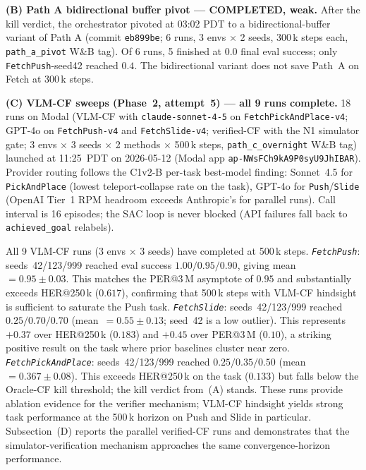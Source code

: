 \documentclass{article}
\begin{document}
\textbf{(B) Path A bidirectional buffer pivot --- COMPLETED, weak.}
After the kill verdict, the orchestrator pivoted at 03:02 PDT to a
bidirectional-buffer variant of Path A (commit \texttt{eb899be}; 6 runs,
3 envs $\times$ 2 seeds, 300\,k steps each, \texttt{path\_a\_pivot} W\&B
tag). Of 6 runs, 5 finished at $0.0$ final eval success; only
\texttt{FetchPush}-seed42 reached $0.4$. The bidirectional variant does
not save Path~A on Fetch at 300\,k steps.

\textbf{(C) VLM-CF sweeps (Phase~2, attempt~5) --- all 9 runs complete.}
18 runs on Modal (VLM-CF with \texttt{claude-sonnet-4-5} on
\texttt{FetchPickAndPlace-v4}; GPT-4o on \texttt{FetchPush-v4} and
\texttt{FetchSlide-v4}; verified-CF with the N1 simulator gate; 3 envs
$\times$ 3 seeds $\times$ 2 methods $\times$ 500\,k steps, \texttt{path\_c\_overnight}
W\&B tag) launched at 11:25~PDT on 2026-05-12 (Modal app
\texttt{ap-NWsFCh9kA9P0syU9JhIBAR}). Provider routing follows the
C1v2-B per-task best-model finding: Sonnet~4.5 for \texttt{PickAndPlace}
(lowest teleport-collapse rate on the task), GPT-4o for
\texttt{Push}/\texttt{Slide} (OpenAI Tier~1 RPM headroom exceeds Anthropic's
for parallel runs). Call interval is 16 episodes; the SAC loop is never
blocked (API failures fall back to \texttt{achieved\_goal} relabels).

All 9 VLM-CF runs (3 envs $\times$ 3 seeds) have completed at 500\,k steps.
\emph{\texttt{FetchPush}}: seeds~42/123/999 reached eval success
$1.00/0.95/0.90$, giving mean~$=0.95\!\pm\!0.03$.
This matches the PER@3\,M asymptote of $0.95$ and substantially exceeds
HER@250\,k ($0.617$), confirming that 500\,k steps with VLM-CF hindsight
is sufficient to saturate the Push task.
\emph{\texttt{FetchSlide}}: seeds~42/123/999 reached $0.25/0.70/0.70$
(mean~$=0.55\!\pm\!0.13$; seed~42 is a low outlier).
This represents $+0.37$ over HER@250\,k ($0.183$) and $+0.45$ over
PER@3\,M ($0.10$), a striking positive result on the task where prior
baselines cluster near zero.
\emph{\texttt{FetchPickAndPlace}}: seeds~42/123/999 reached $0.25/0.35/0.50$
(mean~$=0.367\!\pm\!0.08$).
This exceeds HER@250\,k on the task ($0.133$) but falls below the
Oracle-CF kill threshold; the kill verdict from~(A) stands.
These runs provide ablation evidence for the verifier mechanism; VLM-CF
hindsight yields strong task performance at the 500\,k horizon on Push
and Slide in particular.
Subsection~(D) reports the parallel verified-CF runs and demonstrates that
the simulator-verification mechanism approaches the same convergence-horizon
performance.
\end{document}
